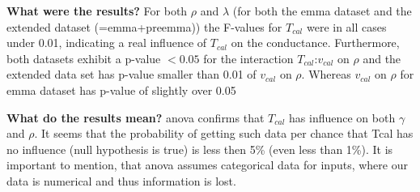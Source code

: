 \textbf{What were the results?}
For both $\rho$ and $\lambda$ (for both the \gls{emma} dataset and the extended dataset (=\gls{emma}+pre\gls{emma})) 
the F-values for $T_{cal}$ were in all cases under 0.01, 
indicating a real influence of $T_{cal}$ on the conductance.
Furthermore, both datasets exhibit a p-value $< 0.05$ for the interaction $T_{cal}$:$v_{cal}$ on $\rho$
and the extended data set has p-value smaller than 0.01 of $v_{cal}$ on $\rho$. 
Whereas $v_{cal}$ on $\rho$ for \gls{emma} dataset has p-value of slightly over 0.05

\textbf{What do the results mean?} 
\Gls{anova} confirms that $T_{cal}$ has influence on both $\gamma$ and $\rho$. 
It seems that the probability of getting such data per chance that Tcal has no influence 
(null hypothesis is true) is less then 5\% (even less than 1\%). 
It is important to mention, that \gls{anova} assumes categorical data for inputs, 
where our data is numerical and thus information is lost. 



